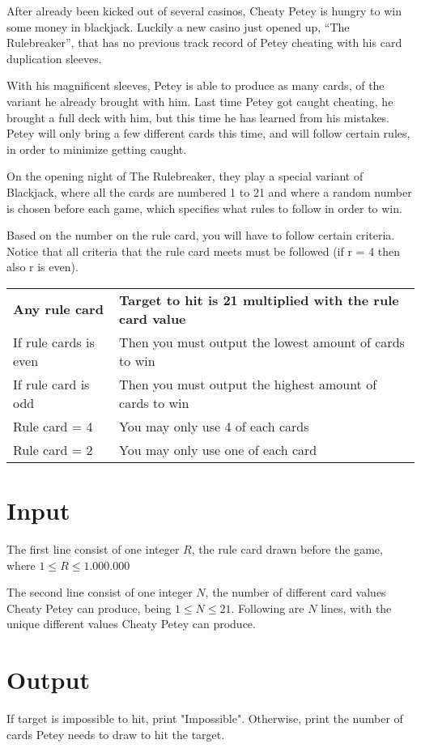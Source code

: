 
After already been kicked out of several casinos, Cheaty Petey is hungry to win some money in blackjack. Luckily a new casino just opened up, “The Rulebreaker”, that has no previous track record of Petey cheating with his card duplication sleeves.

With his magnificent sleeves, Petey is able to produce as many cards, of the variant he already brought with him. Last time Petey got caught cheating, he brought a full deck with him, but this time he has learned from his mistakes. Petey will only bring a few different cards this time, and will follow certain rules, in order to minimize getting caught.

On the opening night of The Rulebreaker, they play a special variant of Blackjack, where all the cards are numbered 1 to 21 and where a random number is chosen before each game, which specifies what rules to follow in order to win. 

Based on the number on the rule card, you will have to follow certain criteria. Notice that all criteria that the rule card meets must be followed (if r = 4 then also r is even). 

\begin{tabular}{ll}
\textbf{Any rule card} & \textbf{Target to hit is 21 multiplied with the rule card value} \\
If rule cards is even & Then you must output the lowest amount of cards to win  \\
If rule card is odd   & Then you must output the highest amount of cards to win \\
Rule card = 4         & You may only use 4 of each cards                        \\
Rule card = 2         & You may only use one of each card                      
\end{tabular}


\section*{Input}
The first line consist of one integer $R$, the rule card drawn before the game, where 
$1\leq R \leq 1.000.000$



The second line consist of one integer $N$, the number of different card values Cheaty Petey can produce, being $1\leq N \leq 21$. Following are $N$ lines, with the unique different values Cheaty Petey can produce.

\section*{Output}
If target is impossible to hit, print "Impossible". Otherwise, print the number of cards Petey needs to draw to hit the target.
